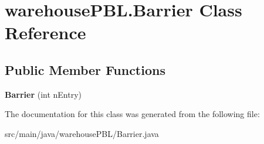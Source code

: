 \hypertarget{classwarehouse_p_b_l_1_1_barrier}{}\section{warehouse\+P\+B\+L.\+Barrier Class Reference}
\label{classwarehouse_p_b_l_1_1_barrier}
\subsection*{Public Member Functions}
\begin{DoxyCompactItemize}
\item 
\mbox{\label{classwarehouse_p_b_l_1_1_barrier_a4e93f9098bcec1f263be2c9cde1d9983}} 
{\bfseries Barrier} (int n\+Entry)
\end{DoxyCompactItemize}


The documentation for this class was generated from the following file\+:\begin{DoxyCompactItemize}
\item 
src/main/java/warehouse\+P\+B\+L/Barrier.\+java\end{DoxyCompactItemize}
